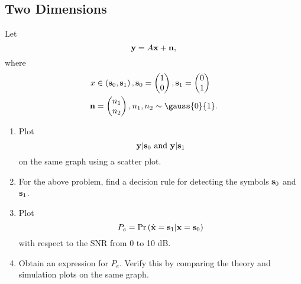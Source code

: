 \documentclass[journal,12pt,twocolumn]{IEEEtran}
\begin{document}
\begin{enumerate}[label=\thesection.\arabic*
,ref=\thesection.\theenumi]
\section{Two Dimensions}
Let
\begin{equation}
\mathbf{y} = A\mathbf{x} + \mathbf{n},
\end{equation}
where
\begin{align}
x &\in \brak{\mbf{s}_0,\mbf{s}_1},
\mbf{s}_0 =
\begin{pmatrix}
1
\\
0
\end{pmatrix},
\mbf{s}_1 =
\begin{pmatrix}
0
\\
1
\end{pmatrix}
\\
\mbf{n} &=
\begin{pmatrix}
n_1
\\
n_2
\end{pmatrix},
n_1,n_2 \sim \gauss{0}{1}.
\end{align}
%
\begin{enumerate}[label=\thesection.\arabic*
,ref=\thesection.\theenumi]
\item
\label{ch5_fsk}
Plot
%
\begin{equation}
\mathbf{y}|\mathbf{s}_0 \text{ and } \mathbf{y}|\mathbf{s}_1
\end{equation}
%
on the same graph using a scatter plot.
%
\item
For the above problem, find a decision rule for detecting the symbols $\mathbf{s}_0 $ and $\mathbf{s}_1$.
%
\item
Plot
\begin{equation}
P_e = \Pr\left(\hat{\mathbf{x}} = \mathbf{s}_1|\mathbf{x} = \mathbf{s}_0\right)
\end{equation}
with respect to the SNR from 0 to 10 dB.
%
\item
Obtain an expression for $P_e$. Verify this by comparing the theory and simulation plots on the same graph.
%
		\end{enumerate}
\end{enumerate}
\end{document}
